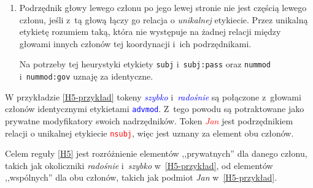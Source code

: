 \begin{enumerate}
\item[\namedlabel{H5}{(H5)}]
Podrzędnik głowy lewego członu po jego lewej stronie nie jest częścią lewego członu, jeśli z~tą głową łączy go relacja o \emph{unikalnej} etykiecie. Przez unikalną etykietę rozumiem taką, która nie występuje na żadnej relacji między głowami innych członów tej koordynacji i~ich podrzędnikami. 

Na potrzeby tej heurystyki etykiety \texttt{subj} i~\texttt{subj:pass} oraz \texttt{nummod} i~\texttt{nummod:gov} uznaję za identyczne.
\end{enumerate}

W przykładzie \eqref{H5-przykład} tokeny \textcolor{blue}{\textit{szybko}} i~\textcolor{blue}{\textit{radośnie}} są połączone z~głowami członów identycznymi etykietami \textcolor{blue}{\texttt{advmod}}. Z~tego powodu są potraktowane jako prywatne modyfikatory swoich nadrzędników. Token \textcolor{red}{\textit{Jan}} jest podrzędnikiem relacji o unikalnej etykiecie \textcolor{red}{\texttt{nsubj}}, więc jest uznany za element obu członów.

\begin{exe}
\ex \label{H5-przykład}
\end{exe}

Celem reguły \ref{H5} jest rozróżnienie elementów ,,prywatnych'' dla danego członu, takich jak okoliczniki \emph{radośnie} i~\emph{szybko} w~\eqref{H5-przykład}, od elementów ,,wspólnych'' dla obu członów, takich jak podmiot \emph{Jan} w~\eqref{H5-przykład}. 

